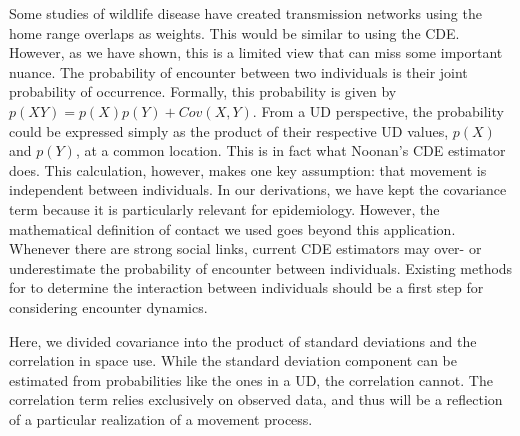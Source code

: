 \documentclass[letterpaper]{article}
\begin{document}


Some studies of wildlife disease have created transmission networks using the home range overlaps as weights. This would be similar to using the CDE.
However, as we have shown, this is a limited view that can miss some important nuance.
The probability of encounter between two individuals is their joint probability of occurrence.  Formally, this probability is given by $p(XY)=p(X)p(Y)+Cov(X,Y)$. From a UD perspective, the probability could be expressed simply as the product of their respective UD values, $p(X)$ and $p(Y)$, at a common location. %
This is in fact what Noonan's CDE estimator does. This calculation, however, makes one key assumption: that movement is independent between individuals. 
In our derivations, we have kept the covariance term because it is particularly relevant for epidemiology. However, the mathematical definition of contact we used goes beyond this application.  Whenever there are strong social links, current CDE estimators may over- or underestimate the probability of encounter between individuals. 
Existing methods for to determine the interaction between individuals \citep{Scharf2018} should be a first step for considering encounter dynamics. 

Here, we divided covariance into the product of standard deviations and the correlation in space use. While the standard deviation component can be estimated from probabilities like the ones in a UD, the correlation cannot. The correlation term relies exclusively on observed data, and thus will be a reflection of a particular realization of a movement process. 
\end{document}

